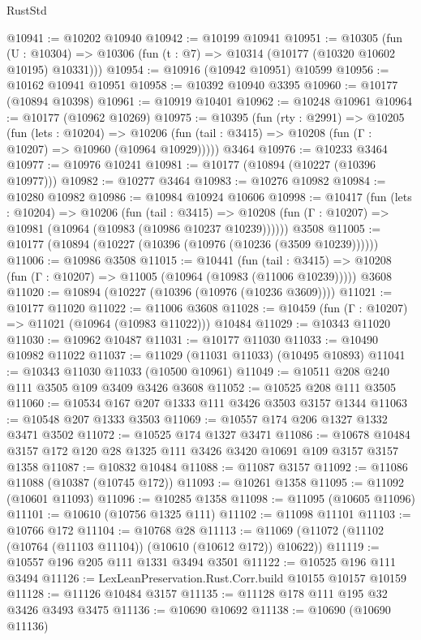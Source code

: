 \begin{lexlean}{RustStd}
\begin{coremodule}
@10941 := @10202 @10940
@10942 := @10199 @10941
@10951 := @10305
    (fun (U : @10304) => @10306 (fun (t : @7) => @10314 (@10177 (@10320 @10602 @10195) @10331)))
@10954 := @10916 (@10942 @10951) @10599
@10956 := @10162 @10941 @10951
@10958 := @10392 @10940 @3395
@10960 := @10177 (@10894 @10398)
@10961 := @10919 @10401
@10962 := @10248 @10961
@10964 := @10177 (@10962 @10269)
@10975 := @10395
    (fun (rty : @2991) =>
    @10205
      (fun (lets : @10204) =>
      @10206 (fun (tail : @3415) => @10208 (fun (Γ : @10207) => @10960 (@10964 @10929)))))
    @3464
@10976 := @10233 @3464
@10977 := @10976 @10241
@10981 := @10177 (@10894 (@10227 (@10396 @10977)))
@10982 := @10277 @3464
@10983 := @10276 @10982
@10984 := @10280 @10982
@10986 := @10984 @10924 @10606
@10998 := @10417
    (fun (lets : @10204) =>
    @10206
      (fun (tail : @3415) =>
      @10208 (fun (Γ : @10207) => @10981 (@10964 (@10983 (@10986 @10237 @10239))))))
    @3508
@11005 := @10177 (@10894 (@10227 (@10396 (@10976 (@10236 (@3509 @10239))))))
@11006 := @10986 @3508
@11015 := @10441
    (fun (tail : @3415) => @10208 (fun (Γ : @10207) => @11005 (@10964 (@10983 (@11006 @10239)))))
    @3608
@11020 := @10894 (@10227 (@10396 (@10976 (@10236 @3609))))
@11021 := @10177 @11020
@11022 := @11006 @3608
@11028 := @10459 (fun (Γ : @10207) => @11021 (@10964 (@10983 @11022))) @10484
@11029 := @10343 @11020
@11030 := @10962 @10487
@11031 := @10177 @11030
@11033 := @10490 @10982 @11022
@11037 := @11029 (@11031 @11033) (@10495 @10893)
@11041 := @10343 @11030 @11033 (@10500 @10961)
@11049 := @10511 @208 @240 @111 @3505 @109 @3409 @3426 @3608
@11052 := @10525 @208 @111 @3505
@11060 := @10534 @167 @207 @1333 @111 @3426 @3503 @3157 @1344
@11063 := @10548 @207 @1333 @3503
@11069 := @10557 @174 @206 @1327 @1332 @3471 @3502
@11072 := @10525 @174 @1327 @3471
@11086 := @10678 @10484 @3157 @172 @120 @28 @1325 @111 @3426 @3420 @10691 @109 @3157 @3157 @1358
@11087 := @10832 @10484
@11088 := @11087 @3157
@11092 := @11086 @11088 (@10387 (@10745 @172))
@11093 := @10261 @1358
@11095 := @11092 (@10601 @11093)
@11096 := @10285 @1358
@11098 := @11095 (@10605 @11096)
@11101 := @10610 (@10756 @1325 @111)
@11102 := @11098 @11101
@11103 := @10766 @172
@11104 := @10768 @28
@11113 := @11069 (@11072 (@11102 (@10764 (@11103 @11104)) (@10610 (@10612 @172)) @10622))
@11119 := @10557 @196 @205 @111 @1331 @3494 @3501
@11122 := @10525 @196 @111 @3494
@11126 := LexLeanPreservation.Rust.Corr.build @10155 @10157 @10159
@11128 := @11126 @10484 @3157
@11135 := @11128 @178 @111 @195 @32 @3426 @3493 @3475
@11136 := @10690 @10692
@11138 := @10690 (@10690 @11136)

\end{coremodule}
\end{lexlean}
